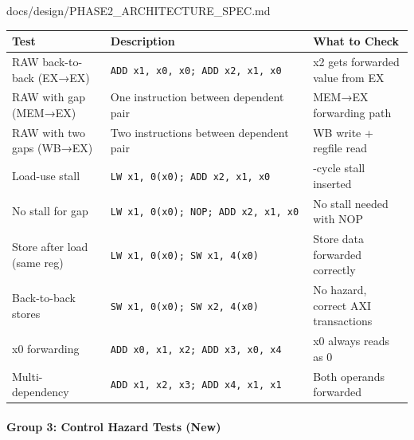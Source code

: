 \begin{relocated}{docs/design/PHASE2_ARCHITECTURE_SPEC.md}
{
\begin{longtable}[]{@{}
  >{\raggedright\arraybackslash}p{}
  >{\raggedright\arraybackslash}p{}
  >{\raggedright\arraybackslash}p{}@{}}
\toprule\noalign{}
\begin{minipage}[b]{\linewidth}\raggedright
Test
\end{minipage} & \begin{minipage}[b]{\linewidth}\raggedright
Description
\end{minipage} & \begin{minipage}[b]{\linewidth}\raggedright
What to Check
\end{minipage} \\
\midrule\noalign{}
\endhead
\bottomrule\noalign{}
\endlastfoot
RAW back-to-back (EX→EX) &
\texttt{ADD\ x1,\allowbreak{}\ x0,\allowbreak{}\ x0;\ ADD\ x2,\allowbreak{}\ x1,\allowbreak{}\ x0}
& x2 gets forwarded value from EX \\
RAW with gap (MEM→EX) & One instruction between dependent pair & MEM→EX
forwarding path \\
RAW with two gaps (WB→EX) & Two instructions between dependent pair & WB
write + regfile read \\
Load-use stall &
\texttt{LW\ x1,\allowbreak{}\ 0(x0);\ ADD\ x2,\allowbreak{}\ x1,\allowbreak{}\ x0}
& 1-cycle stall inserted \\
No stall for gap &
\texttt{LW\ x1,\allowbreak{}\ 0(x0);\ NOP;\ ADD\ x2,\allowbreak{}\ x1,\allowbreak{}\ x0}
& No stall needed with NOP \\
Store after load (same reg) &
\texttt{LW\ x1,\allowbreak{}\ 0(x0);\ SW\ x1,\allowbreak{}\ 4(x0)} &
Store data forwarded correctly \\
Back-to-back stores &
\texttt{SW\ x1,\allowbreak{}\ 0(x0);\ SW\ x2,\allowbreak{}\ 4(x0)} & No
hazard, correct AXI transactions \\
x0 forwarding &
\texttt{ADD\ x0,\allowbreak{}\ x1,\allowbreak{}\ x2;\ ADD\ x3,\allowbreak{}\ x0,\allowbreak{}\ x4}
& x0 always reads as 0 \\
Multi-dependency &
\texttt{ADD\ x1,\allowbreak{}\ x2,\allowbreak{}\ x3;\ ADD\ x4,\allowbreak{}\ x1,\allowbreak{}\ x1}
& Both operands forwarded \\
\end{longtable}
}

\paragraph{Group 3: Control Hazard Tests (New)}\label{ds:ch:phase2-architecture:group-3-control-hazard-tests-new}


\end{relocated}
